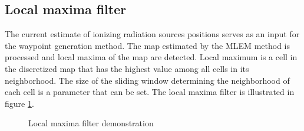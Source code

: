 \subsection{Local maxima filter}
The current estimate of ionizing radiation sources positions serves as an input for the waypoint generation method.
The map estimated by the \ac{MLEM} method is processed and local maxima of the map are detected.
Local maximum is a cell in the discretized map that has the highest value among all cells in its neighborhood. 
The size of the sliding window determining the neighborhood of each cell is a parameter that can be set.
The local maxima filter is illustrated in figure \ref{fig:filter}.

\begin{figure}[!htb]
  \centering
  \caption{Local maxima filter demonstration}
  \label{fig:filter}
\end{figure}%

